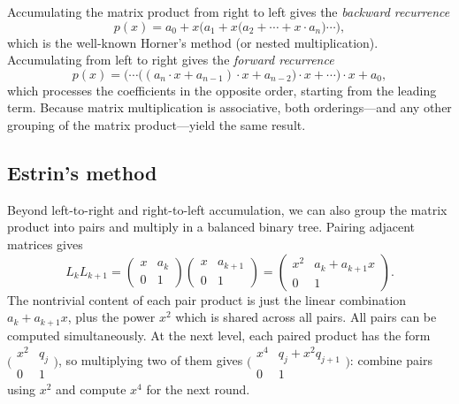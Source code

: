 \documentclass{article}
\begin{document}
Accumulating the matrix product from right to left gives the \emph{backward recurrence}
\begin{equation}
  p(x) = a_0 + x\bigl(a_1 + x\bigl(a_2 + \cdots + x \cdot a_n\bigr)\cdots\bigr),
\end{equation}
which is the well-known Horner's method (or nested multiplication). Accumulating from left to right gives the \emph{forward recurrence}
\begin{equation}
  p(x) = \bigl(\cdots\bigl((a_n \cdot x + a_{n-1}) \cdot x + a_{n-2}\bigr) \cdot x + \cdots\bigr) \cdot x + a_0,
\end{equation}
which processes the coefficients in the opposite order, starting from the leading term. Because matrix multiplication is associative, both orderings---and any other grouping of the matrix product---yield the same result.

\subsection*{Estrin's method}

Beyond left-to-right and right-to-left accumulation, we can also group the matrix product into pairs and multiply in a balanced binary tree. Pairing adjacent matrices gives
\begin{equation}
  L_k L_{k+1}
  = \begin{pmatrix} x & a_k \\ 0 & 1 \end{pmatrix}
    \begin{pmatrix} x & a_{k+1} \\ 0 & 1 \end{pmatrix}
  = \begin{pmatrix} x^2 & a_k + a_{k+1} x \\ 0 & 1 \end{pmatrix}.
\end{equation}
The nontrivial content of each pair product is just the linear combination $a_k + a_{k+1} x$, plus the power $x^2$ which is shared across all pairs. All pairs can be computed simultaneously. At the next level, each paired product has the form $\bigl(\begin{smallmatrix} x^2 & q_j \\ 0 & 1 \end{smallmatrix}\bigr)$, so multiplying two of them gives $\bigl(\begin{smallmatrix} x^4 & q_j + x^2 q_{j+1} \\ 0 & 1 \end{smallmatrix}\bigr)$: combine pairs using $x^2$ and compute $x^4$ for the next round.
\end{document}
